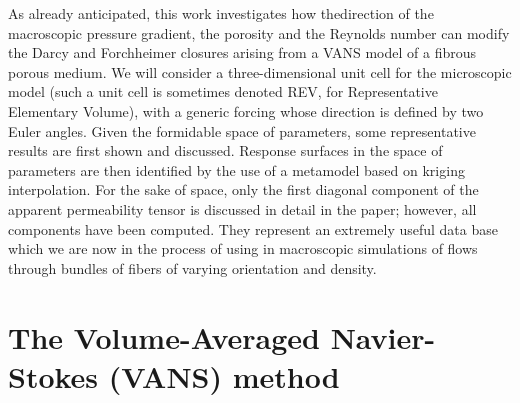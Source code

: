 As already anticipated, this work investigates how thedirection of the macroscopic pressure gradient, the porosity and the Reynolds number can 
modify the Darcy and Forchheimer closures arising from a VANS model of a fibrous porous medium. We will consider a three-dimensional 
unit cell for the microscopic model (such a unit cell is sometimes denoted REV, for Representative Elementary Volume), with a generic forcing 
whose direction is defined by two Euler angles. Given the formidable space of parameters, some representative results are first
shown and discussed. Response surfaces in the space of parameters are then identified by the use of a metamodel based on kriging 
interpolation. For the sake of space, only the first diagonal component of the apparent permeability tensor is discussed 
in detail in the paper; however, all components have been computed.
They represent an extremely useful data base which we are now in the process of using in macroscopic simulations of 
flows through bundles of fibers of varying orientation and density.





\section{The Volume-Averaged Navier-Stokes (VANS) method}

\label{sec:2ch4}

